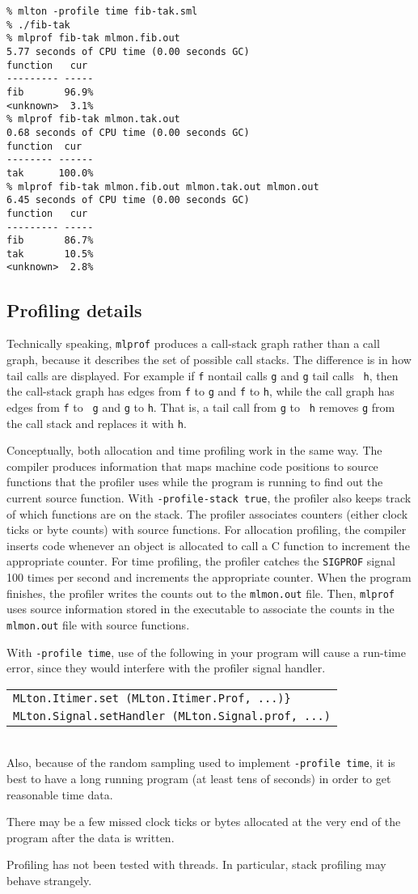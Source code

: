 \begin{verbatim}
% mlton -profile time fib-tak.sml
% ./fib-tak
% mlprof fib-tak mlmon.fib.out
5.77 seconds of CPU time (0.00 seconds GC)
function   cur 
--------- -----
fib       96.9%
<unknown>  3.1%
% mlprof fib-tak mlmon.tak.out
0.68 seconds of CPU time (0.00 seconds GC)
function  cur  
-------- ------
tak      100.0%
% mlprof fib-tak mlmon.fib.out mlmon.tak.out mlmon.out
6.45 seconds of CPU time (0.00 seconds GC)
function   cur 
--------- -----
fib       86.7%
tak       10.5%
<unknown>  2.8%
\end{verbatim}
%
\subsection{Profiling details}

Technically speaking, {\tt mlprof} produces a call-stack graph rather
than a call graph, because it describes the set of possible call
stacks.  The difference is in how tail calls are displayed.  For
example if {\tt f} nontail calls {\tt g} and {\tt g} tail calls {\tt
h}, then the call-stack graph has edges from {\tt f} to {\tt g} and
{\tt f} to {\tt h}, while the call graph has edges from {\tt f} to {\tt
g} and {\tt g} to {\tt h}.  That is, a tail call from {\tt g} to {\tt
h} removes {\tt g} from the call stack and replaces it with {\tt h}.

Conceptually, both allocation and time profiling work in the same way.
The compiler produces information that maps machine code positions to
source functions that the profiler uses while the program is running
to find out the current source function.  With {\tt -profile-stack
true}, the profiler also keeps track of which functions are on the
stack.  The profiler associates counters (either clock ticks or byte
counts) with source functions.  For allocation profiling, the compiler
inserts code whenever an object is allocated to call a C function to
increment the appropriate counter.  For time profiling, the profiler
catches the {\tt SIGPROF} signal 100 times per second and increments
the appropriate counter.  When the program finishes, the profiler
writes the counts out to the {\tt mlmon.out} file.  Then, {\tt mlprof}
uses source information stored in the executable to associate the
counts in the {\tt mlmon.out} file with source functions.

With {\tt -profile time}, use of the following in your program will
cause a run-time error, since they would interfere with the profiler
signal handler.\\
\begin{tabular}{l}
\tt MLton.Itimer.set (MLton.Itimer.Prof, ...)\}\\
\tt MLton.Signal.setHandler (MLton.Signal.prof, ...)
\end{tabular}\\
Also, because of the random sampling used to implement {\tt -profile
time}, it is best to have a long running program (at least tens of
seconds) in order to get reasonable time data.

There may be a few missed clock ticks or bytes allocated at the
very end of the program after the data is written.

Profiling has not been tested with threads.  In particular, stack
profiling may behave strangely.
